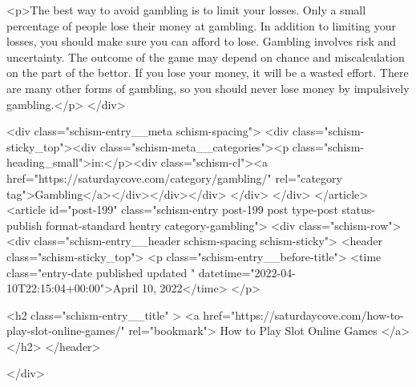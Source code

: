 {<p>The best way to avoid gambling is to limit your losses. Only a small percentage of people lose their money at gambling. In addition to limiting your losses, you should make sure you can afford to lose. Gambling involves risk and uncertainty. The outcome of the game may depend on chance and miscalculation on the part of the bettor. If you lose your money, it will be a wasted effort. There are many other forms of gambling, so you should never lose money by impulsively gambling.</p>
		</div>

		<div class="schism-entry__meta schism-spacing">			<div class="schism-sticky_top"><div class="schism-meta__categories"><p class="schism-heading_small">in:</p><div class="schism-cl"><a href="https://saturdaycove.com/category/gambling/" rel="category tag">Gambling</a></div></div></div>		</div>
	</div>
</article>
<article id="post-199" class="schism-entry post-199 post type-post status-publish format-standard hentry category-gambling">
	<div class="schism-row">		<div class="schism-entry__header schism-spacing schism-sticky">			<header class="schism-sticky_top">				<p class="schism-entry__before-title">
					<time class="entry-date published updated " datetime="2022-04-10T22:15:04+00:00">April 10, 2022</time>				</p>

				<h2 class="schism-entry__title" >
					<a href="https://saturdaycove.com/how-to-play-slot-online-games/" rel="bookmark">
						How to Play Slot Online Games					</a>
				</h2>
			</header>

					</div>

}

